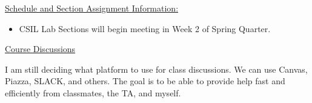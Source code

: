 %  
%  
%
%  
%
\noindent \underline{Schedule and Section Assignment Information:}

  \begin{itemize}

    \item CSIL Lab Sections will begin meeting in Week 2 of Spring Quarter. 

  \end{itemize}
  


\noindent \underline{Course Discussions}

\noindent I am still deciding what platform to use for class discussions. We can use Canvas, Piazza, SLACK, and others. The goal is to be able to provide help fast and efficiently from classmates, the TA, and myself. 

